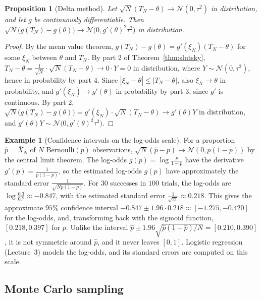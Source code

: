 \documentclass[11pt]{article}
\theoremstyle{definition}
\newtheorem{example}[definition]{Example}
\theoremstyle{plain}
\newtheorem{proposition}[definition]{Proposition}
\theoremstyle{remark}
\begin{document}
\begin{proposition}[Delta method]\label{prop:delta-method}
    Let $\sqrt{N}(T_N - \theta) \to \mathcal{N}(0, \tau^2)$ in distribution, and let $g$ be continuously differentiable. Then $\sqrt{N}\big(g(T_N) - g(\theta)\big) \to \mathcal{N}\big(0, g'(\theta)^2\tau^2\big)$ in distribution.
\end{proposition}

\begin{proof}
    By the mean value theorem, $g(T_N) - g(\theta) = g'(\xi_N)(T_N - \theta)$ for some $\xi_N$ between $\theta$ and $T_N$. By part 2 of Theorem~\ref{thm:slutsky}, $T_N - \theta = \frac{1}{\sqrt{N}} \cdot \sqrt{N}(T_N - \theta) \to 0 \cdot Y = 0$ in distribution, where $Y \sim \mathcal{N}(0, \tau^2)$, hence in probability by part 4. Since $|\xi_N - \theta| \leq |T_N - \theta|$, also $\xi_N \to \theta$ in probability, and $g'(\xi_N) \to g'(\theta)$ in probability by part 3, since $g'$ is continuous. By part 2, $\sqrt{N}\big(g(T_N) - g(\theta)\big) = g'(\xi_N) \cdot \sqrt{N}(T_N - \theta) \to g'(\theta)Y$ in distribution, and $g'(\theta)Y \sim \mathcal{N}\big(0, g'(\theta)^2\tau^2\big)$.
\end{proof}

\begin{example}[Confidence intervals on the log-odds scale]\label{ex:delta}
    For a proportion $\hat p = \bar X_N$ of $N$ Bernoulli$(p)$ observations, $\sqrt{N}(\hat p - p) \to \mathcal{N}(0, p(1 - p))$ by the central limit theorem. The log-odds $g(p) = \log\frac{p}{1 - p}$ have the derivative $g'(p) = \frac{1}{p(1 - p)}$, so the estimated log-odds $g(\hat p)$ have approximately the standard error $\frac{1}{\sqrt{Np(1 - p)}}$. For $30$ successes in $100$ trials, the log-odds are $\log\frac{0.3}{0.7} \approx -0.847$, with the estimated standard error $\frac{1}{\sqrt{21}} \approx 0.218$. This gives the approximate $95\%$ confidence interval $-0.847 \pm 1.96 \cdot 0.218 \approx [-1.275, -0.420]$ for the log-odds, and, transforming back with the sigmoid function, $[0.218, 0.397]$ for $p$. Unlike the interval $\hat p \pm 1.96\sqrt{\hat p(1 - \hat p)/N} = [0.210, 0.390]$, it is not symmetric around $\hat p$, and it never leaves $[0, 1]$. Logistic regression (Lecture~3) models the log-odds, and its standard errors are computed on this scale.
\end{example}

\subsection{Monte Carlo sampling}\label{sec:monte-carlo}
\end{document}
